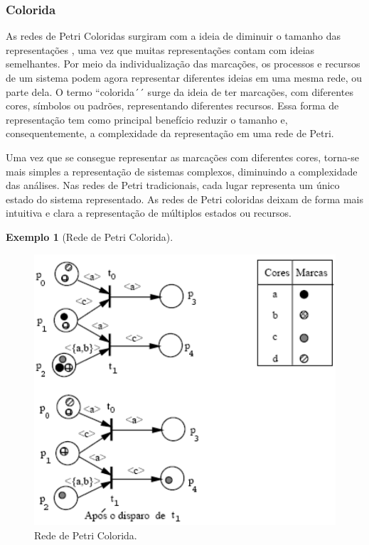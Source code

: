 \documentclass[
	12pt,				%
	openright,			%
	oneside,			%
	a4paper,			%
	english,			%
	brazil				%
	]{abntex2}
\theoremstyle{doispontos}
\newtheorem{exemplo}{Exemplo}
\begin{document}
\subsubsection{Colorida} \label{cap:redeColorida}

As redes de Petri Coloridas surgiram com a ideia de diminuir o tamanho das representações \textcite{frances2003introduccao}, uma vez que muitas representações contam com ideias semelhantes. Por meio da individualização das marcações, os processos e recursos de um sistema podem agora representar diferentes ideias em uma mesma rede, ou parte dela. O termo ``colorida´´ surge da ideia de ter marcações, com diferentes cores, símbolos ou padrões, representando diferentes recursos. Essa forma de representação tem como principal benefício reduzir o tamanho e, consequentemente, a complexidade da representação em uma rede de Petri.

Uma vez que se consegue representar as marcações com diferentes cores, torna-se mais simples a representação de sistemas complexos, diminuindo a complexidade das análises. Nas redes de Petri tradicionais, cada lugar representa um único estado do sistema representado. As redes de Petri coloridas deixam de forma mais intuitiva e clara a representação de múltiplos estados ou recursos. 

\begin{exemplo} [Rede de Petri Colorida]
\label{exemplo_colorida}
\end{exemplo}

\begin{figure}[ht] 
	\centering
	\includegraphics[scale=0.35]{figuras/rede_petri_colorida.png}
	\caption[Rede de Petri Colorida]{Rede de Petri Colorida. \textcite{inbook}}
	\label{fig:rede_petri_colorida}
\end{figure}
\FloatBarrier
\end{document}
